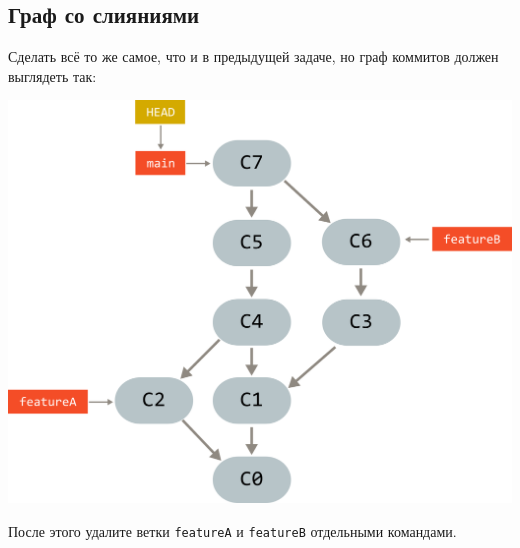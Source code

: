 \documentclass{article}
\begin{document}
\subsection{Граф со слияниями}
Сделать всё то же самое, что и в предыдущей задаче, но граф коммитов должен выглядеть так:
\begin{center}
\includegraphics[scale=0.9]{../images/graph_with_merges.png}
\end{center}
После этого удалите ветки \texttt{featureA} и \texttt{featureB} отдельными командами.
\end{document}
